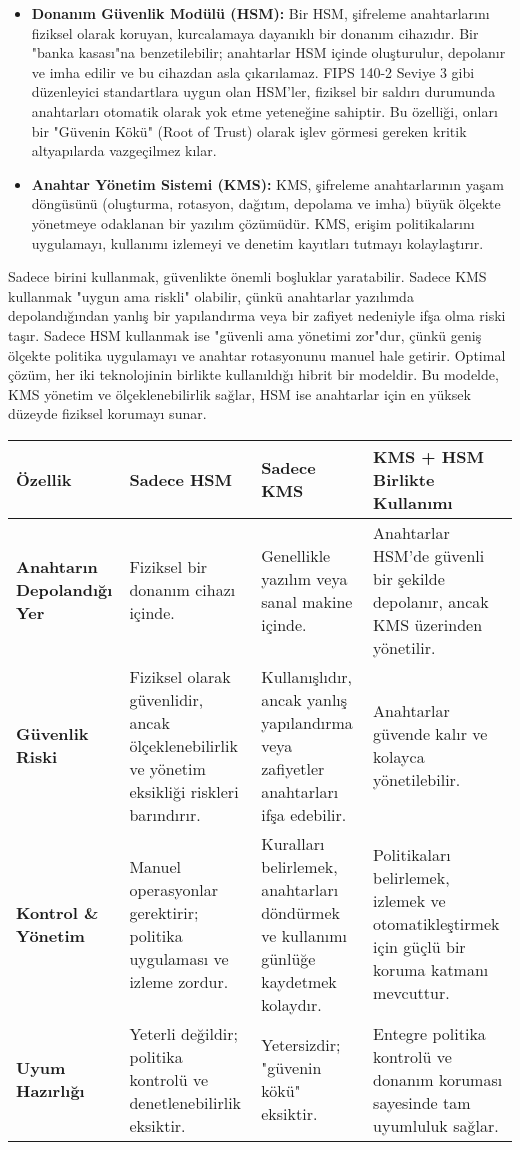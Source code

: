 \begin{itemize}
    \item \textbf{Donanım Güvenlik Modülü (HSM):} Bir HSM, şifreleme anahtarlarını fiziksel olarak koruyan, kurcalamaya dayanıklı bir donanım cihazıdır. Bir "banka kasası"na benzetilebilir; anahtarlar HSM içinde oluşturulur, depolanır ve imha edilir ve bu cihazdan asla çıkarılamaz. FIPS 140-2 Seviye 3 gibi düzenleyici standartlara uygun olan HSM'ler, fiziksel bir saldırı durumunda anahtarları otomatik olarak yok etme yeteneğine sahiptir. Bu özelliği, onları bir "Güvenin Kökü" (Root of Trust) olarak işlev görmesi gereken kritik altyapılarda vazgeçilmez kılar.
    \item \textbf{Anahtar Yönetim Sistemi (KMS):} KMS, şifreleme anahtarlarının yaşam döngüsünü (oluşturma, rotasyon, dağıtım, depolama ve imha) büyük ölçekte yönetmeye odaklanan bir yazılım çözümüdür. KMS, erişim politikalarını uygulamayı, kullanımı izlemeyi ve denetim kayıtları tutmayı kolaylaştırır.
\end{itemize}

Sadece birini kullanmak, güvenlikte önemli boşluklar yaratabilir. Sadece KMS kullanmak "uygun ama riskli" olabilir, çünkü anahtarlar yazılımda depolandığından yanlış bir yapılandırma veya bir zafiyet nedeniyle ifşa olma riski taşır. Sadece HSM kullanmak ise "güvenli ama yönetimi zor"dur, çünkü geniş ölçekte politika uygulamayı ve anahtar rotasyonunu manuel hale getirir. Optimal çözüm, her iki teknolojinin birlikte kullanıldığı hibrit bir modeldir. Bu modelde, KMS yönetim ve ölçeklenebilirlik sağlar, HSM ise anahtarlar için en yüksek düzeyde fiziksel korumayı sunar.

\begin{adjustbox}{max width=\textwidth}
\begin{tabularx}{\textwidth}{|l|X|X|X|}
\hline
\textbf{Özellik} & \textbf{Sadece HSM} & \textbf{Sadece KMS} & \textbf{KMS + HSM Birlikte Kullanımı} \\
\hline
\textbf{Anahtarın Depolandığı Yer} & Fiziksel bir donanım cihazı içinde. & Genellikle yazılım veya sanal makine içinde. & Anahtarlar HSM'de güvenli bir şekilde depolanır, ancak KMS üzerinden yönetilir. \\
\hline
\textbf{Güvenlik Riski} & Fiziksel olarak güvenlidir, ancak ölçeklenebilirlik ve yönetim eksikliği riskleri barındırır. & Kullanışlıdır, ancak yanlış yapılandırma veya zafiyetler anahtarları ifşa edebilir. & Anahtarlar güvende kalır ve kolayca yönetilebilir. \\
\hline
\textbf{Kontrol \& Yönetim} & Manuel operasyonlar gerektirir; politika uygulaması ve izleme zordur. & Kuralları belirlemek, anahtarları döndürmek ve kullanımı günlüğe kaydetmek kolaydır. & Politikaları belirlemek, izlemek ve otomatikleştirmek için güçlü bir koruma katmanı mevcuttur. \\
\hline
\textbf{Uyum Hazırlığı} & Yeterli değildir; politika kontrolü ve denetlenebilirlik eksiktir. & Yetersizdir; "güvenin kökü" eksiktir. & Entegre politika kontrolü ve donanım koruması sayesinde tam uyumluluk sağlar. \\
\hline
\end{tabularx}
\end{adjustbox}


